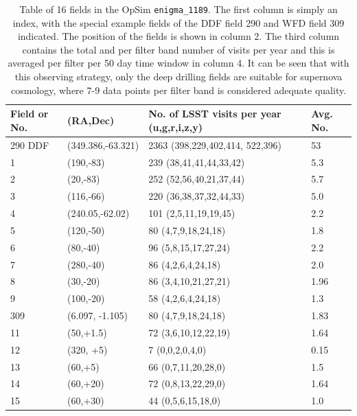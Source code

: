 \begin{center}
\begin{table}
\centering
\begin{tabular}{|p{0.9cm} |p{3.3cm}|p{4cm}|p{1.7cm}|}
\hline
 Field or No. & (RA,Dec) & No. of LSST visits per year (u,g,r,i,z,y)       & Avg. No.\\
\hline
290 DDF  & (349.386,-63.321)  & 2363 (398,229,402,414, 522,396) & 53 \\
 1      & (190,-83) &    239 (38,41,41,44,33,42) & 5.3\\
 2      &(20,-83) & 252 (52,56,40,21,37,44)  &5.7\\
3      &(116,-66) &  220 (36,38,37,32,44,33) & 5.0  \\
 4      &(240.05,-62.02) &101 (2,5,11,19,19,45) & 2.2  \\
 5      &(120,-50)  &80 (4,7,9,18,24,18)        & 1.8\\
 6      & (80,-40)  &      96 (5,8,15,17,27,24) &  2.2\\
 7      & (280,-40) &      86 (4,2,6,4,24,18)   &  2.0\\
 8      & (30,-20)  &      86 (3,4,10,21,27,21) &  1.96\\
 9      & (100,-20) &      58 (4,2,6,4,24,18)   &  1.3\\
 309  & (6.097, -1.105) & 80 (4,7,9,18,24,18)  & 1.83\\
 11     & (50,+1.5) &      72 (3,6,10,12,22,19) &  1.64\\
 12     & (320, +5) &      7 (0,0,2,0,4,0)      &  0.15\\
 13     & (60,+5)   &      66 (0,7,11,20,28,0)  &  1.5 \\
 14     & (60,+20)  &      72 (0,8,13,22,29,0)  &  1.64\\
 15     & (60,+30)  &      44 (0,5,6,15,18,0)   &  1.0\\
\hline
\end{tabular}
\caption{Table of 16 fields in the OpSim \texttt{enigma\_1189}. The first column is simply an 
index, with the special example fields of the DDF field 290 and WFD field 309 indicated. The 
position of the fields is shown in column 2. The third column contains the total and per filter 
band number of visits per year and this is averaged per filter per 50 day time window in column 4. 
It can be seen that with this observing strategy, only the deep drilling fields are suitable for 
supernova cosmology, where 7-9 data points per filter band is considered adequate quality.}
\label{tab:lcpositions}
\end{table}
\end{center}

